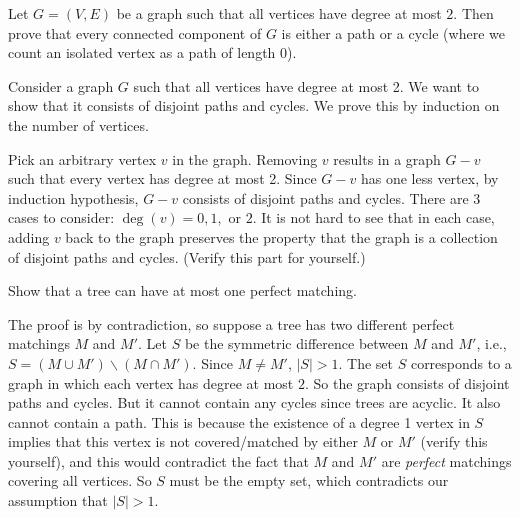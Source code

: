 \begin{flex}
\label{grp:exercise:Graphs-with-max-degree-at-most-2}

\begin{exercise}
\label{exercise:Graphs-with-max-degree-at-most-2}
Let $G = (V,E)$ be a graph such that all vertices have degree at most $2$. Then prove that every connected component of $G$ is either a path or a cycle (where we count an isolated vertex as a path of length 0).

\end{exercise}

\begin{solution}
\label{sol:matchings-in-graphs::consider}
Consider a graph $G$ such that all vertices have degree at most 2. We want to show that it consists of disjoint paths and cycles. We prove this by induction on the number of vertices. 

Pick an arbitrary vertex $v$ in the graph. Removing $v$ results in a graph $G-v$ such that every vertex has degree at most 2. Since $G-v$ has one less vertex, by induction hypothesis, $G-v$ consists of disjoint paths and cycles. There are 3 cases to consider: $\deg(v) = 0, 1,$ or $2$. It is not hard to see that in each case, adding $v$ back to the graph preserves the property that the graph is a collection of disjoint paths and cycles. (Verify this part for yourself.)

\end{solution}
\end{flex}

\begin{flex}
\label{grp:exercise:A-tree-can-have-at-most-one-perfect-matching}

\begin{exercise}
\label{exercise:A-tree-can-have-at-most-one-perfect-matching}
Show that a tree can have at most one perfect matching.

\end{exercise}

\begin{solution}
\label{sol:matchings-in-graphs::contradiction}
The proof is by contradiction, so suppose a tree has two different perfect matchings $M$ and $M'$. Let $S$ be the symmetric difference between $M$ and $M'$, i.e., $S = (M \cup M') \backslash (M \cap M')$. Since $M \neq M'$, $|S| > 1$. The set $S$ corresponds to a graph in which each vertex has degree at most $2$. So the graph consists of disjoint paths and cycles. But it cannot contain any cycles since trees are acyclic. It also cannot contain a path. This is because the existence of a degree 1 vertex in $S$ implies that this vertex is not covered/matched by either $M$ or $M'$ (verify this yourself), and this would contradict the fact that $M$ and $M'$ are \emph{perfect} matchings covering all vertices. So $S$ must be the empty set, which contradicts our assumption that $|S| > 1$.

\end{solution}
\end{flex}

